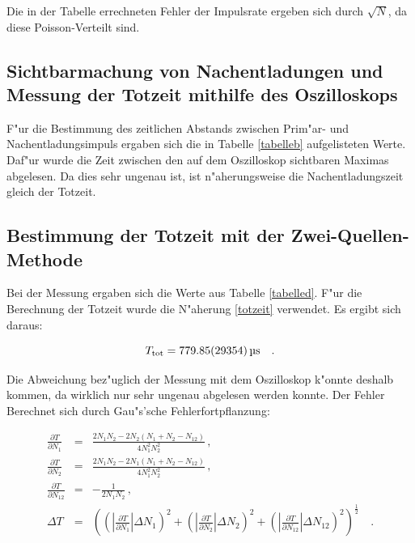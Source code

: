 	Die in der Tabelle errechneten Fehler der Impulsrate ergeben sich durch $\sqrt{N}$, da diese Poisson-Verteilt sind.

	\subsection{Sichtbarmachung von Nachentladungen und Messung der Totzeit mithilfe des Oszilloskops} %
	 \label{sub:sichtbarmachung_von_nachentladungen}

	
	
	F"ur die Bestimmung des zeitlichen Abstands zwischen Prim"ar- und Nachentladungsimpuls ergaben sich die in Tabelle \ref{tabelleb} aufgelisteten Werte. Daf"ur wurde die Zeit zwischen den auf dem Oszilloskop sichtbaren Maximas abgelesen.
	Da dies sehr ungenau ist, ist n"aherungsweise die Nachentladungszeit gleich der Totzeit.

	\subsection{Bestimmung der Totzeit mit der Zwei-Quellen-Methode} %
	\label{sub:bestimmung_der_totzeit_mit_der_zwei_quellen_methode}
	
	

	Bei der Messung ergaben sich die Werte aus Tabelle \ref{tabelled}.
	F"ur die Berechnung der Totzeit wurde die N"aherung \eqref{totzeit} verwendet.
	Es ergibt sich daraus:

	\begin{equation*}
		T_\mathrm{tot} = \SI{779.85 (29354)}{\micro\second} \quad .
	\end{equation*}

	Die Abweichung bez"uglich der Messung mit dem Oszilloskop k"onnte deshalb kommen, da wirklich nur sehr ungenau abgelesen werden konnte.
	Der Fehler Berechnet sich durch Gau"s'sche Fehlerfortpflanzung:

	\begin{eqnarray*}
		\frac{\partial T}{\partial N_\mathrm{1}} &=& \frac{2 N_\mathrm{1}N_\mathrm{2} - 2 N_\mathrm{2}(N_\mathrm{1} + N_\mathrm{2} - N_\mathrm{12})}{4N_\mathrm{1}^2N_\mathrm{2}^2} \, , \\
		\frac{\partial T}{\partial N_\mathrm{2}} &=& \frac{2 N_\mathrm{1}N_\mathrm{2} - 2 N_\mathrm{1}(N_\mathrm{1} + N_\mathrm{2} - N_\mathrm{12})}{4N_\mathrm{1}^2N_\mathrm{2}^2} \, ,\\
		\frac{\partial T}{\partial N_\mathrm{12}} &=& -\frac{1}{2 N_\mathrm{1} N_\mathrm{2}} \, ,\\
		\Delta T &=& \left( \left( |\frac{\partial T}{\partial N_\mathrm{1}}| \Delta N_\mathrm{1} \right)^2 + \left( |\frac{\partial T}{\partial N_\mathrm{2}}| \Delta N_\mathrm{2} \right)^2 + \left( |\frac{\partial T}{\partial N_\mathrm{12}}| \Delta N_\mathrm{12} \right)^2 \right)^\frac{1}{2} \quad .
	\end{eqnarray*}

